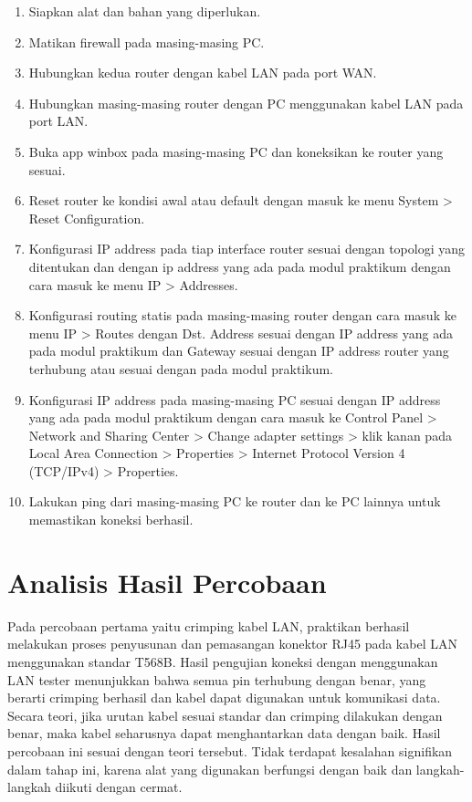 \begin{enumerate}
    \item Siapkan alat dan bahan yang diperlukan.
    \item Matikan firewall pada masing-masing PC.
    \item Hubungkan kedua router dengan kabel LAN pada port WAN.
    \item Hubungkan masing-masing router dengan PC menggunakan kabel LAN pada port LAN.
    \item Buka app winbox pada masing-masing PC dan koneksikan ke router yang sesuai.
    \item Reset router ke kondisi awal atau default dengan masuk ke menu System > Reset Configuration.
    \item Konfigurasi IP address pada tiap interface router sesuai dengan topologi yang ditentukan dan dengan ip address yang ada pada modul praktikum dengan cara masuk ke menu IP > Addresses.
    \item Konfigurasi routing statis pada masing-masing router dengan cara masuk ke menu IP > Routes dengan Dst. Address sesuai dengan IP address yang ada pada modul praktikum dan Gateway sesuai dengan IP address router yang terhubung atau sesuai dengan pada modul praktikum.
    \item Konfigurasi IP address pada masing-masing PC sesuai dengan IP address yang ada pada modul praktikum dengan cara masuk ke Control Panel > Network and Sharing Center > Change adapter settings > klik kanan pada Local Area Connection > Properties > Internet Protocol Version 4 (TCP/IPv4) > Properties.
    \item Lakukan ping dari masing-masing PC ke router dan ke PC lainnya untuk memastikan koneksi berhasil.
    
\end{enumerate}
\section{Analisis Hasil Percobaan}Pada percobaan pertama yaitu crimping kabel LAN, praktikan berhasil melakukan proses penyusunan dan pemasangan konektor RJ45 pada kabel LAN menggunakan standar T568B. Hasil pengujian koneksi dengan menggunakan LAN tester menunjukkan bahwa semua pin terhubung dengan benar, yang berarti crimping berhasil dan kabel dapat digunakan untuk komunikasi data. Secara teori, jika urutan kabel sesuai standar dan crimping dilakukan dengan benar, maka kabel seharusnya dapat menghantarkan data dengan baik. Hasil percobaan ini sesuai dengan teori tersebut. Tidak terdapat kesalahan signifikan dalam tahap ini, karena alat yang digunakan berfungsi dengan baik dan langkah-langkah diikuti dengan cermat.

